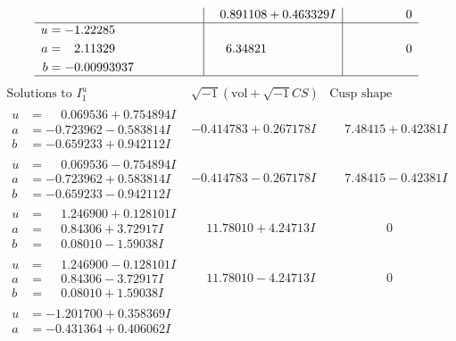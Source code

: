 \documentclass[1p]{elsarticle_modified}
\theoremstyle{definition}
\newcommand{\I}{\sqrt{-1}}
\begin{document}
$$\begin{array}{c|c|c}
 & \phantom{-}0.891108 + 0.463329 I & \phantom{-0.000000 } 0 \\ \hline\begin{aligned}
u &= -1.22285\phantom{ +0.000000I} \\
a &= \phantom{-}2.11329\phantom{ +0.000000I} \\
b &= -0.00993937\phantom{ +0.000000I}\end{aligned}
 & \phantom{-}6.34821\phantom{ +0.000000I} & \phantom{-0.000000 } 0\\
 \hline 
 \end{array}$$\newpage$$\begin{array}{c|c|c}  
\text{Solutions to }I^u_{1}& \I (\text{vol} + \sqrt{-1}CS) & \text{Cusp shape}\\
 \hline 
\begin{aligned}
u &= \phantom{-}0.069536 + 0.754894 I \\
a &= -0.723962 - 0.583814 I \\
b &= -0.659233 + 0.942112 I\end{aligned}
 & -0.414783 + 0.267178 I & \phantom{-}7.48415 + 0.42381 I \\ \hline\begin{aligned}
u &= \phantom{-}0.069536 - 0.754894 I \\
a &= -0.723962 + 0.583814 I \\
b &= -0.659233 - 0.942112 I\end{aligned}
 & -0.414783 - 0.267178 I & \phantom{-}7.48415 - 0.42381 I \\ \hline\begin{aligned}
u &= \phantom{-}1.246900 + 0.128101 I \\
a &= \phantom{-}0.84306 + 3.72917 I \\
b &= \phantom{-}0.08010 - 1.59038 I\end{aligned}
 & \phantom{-}11.78010 + 4.24713 I & \phantom{-0.000000 } 0 \\ \hline\begin{aligned}
u &= \phantom{-}1.246900 - 0.128101 I \\
a &= \phantom{-}0.84306 - 3.72917 I \\
b &= \phantom{-}0.08010 + 1.59038 I\end{aligned}
 & \phantom{-}11.78010 - 4.24713 I & \phantom{-0.000000 } 0 \\ \hline\begin{aligned}
u &= -1.201700 + 0.358369 I \\
a &= -0.431364 + 0.406062 I \\

\end{aligned}
\end{array}$$
\end{document}
